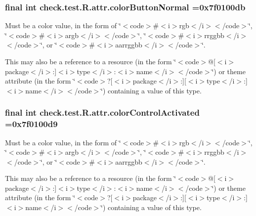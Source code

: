\subsubsection[{color\+Button\+Normal}]{\setlength{\rightskip}{0pt plus 5cm}final int check.\+test.\+R.\+attr.\+color\+Button\+Normal =0x7f0100db\hspace{0.3cm}{\ttfamily [static]}}\label{classcheck_1_1test_1_1_r_1_1attr_abef35f07161bdd7ae466dc158b37e59b}
Must be a color value, in the form of \char`\"{}$<$code$>$\#$<$i$>$rgb$<$/i$>$$<$/code$>$\char`\"{}, \char`\"{}$<$code$>$\#$<$i$>$argb$<$/i$>$$<$/code$>$\char`\"{}, \char`\"{}$<$code$>$\#$<$i$>$rrggbb$<$/i$>$$<$/code$>$\char`\"{}, or \char`\"{}$<$code$>$\#$<$i$>$aarrggbb$<$/i$>$$<$/code$>$\char`\"{}. 

This may also be a reference to a resource (in the form \char`\"{}$<$code$>$@\mbox{[}$<$i$>$package$<$/i$>$\+:\mbox{]}$<$i$>$type$<$/i$>$\+:$<$i$>$name$<$/i$>$$<$/code$>$\char`\"{}) or theme attribute (in the form \char`\"{}$<$code$>$?\mbox{[}$<$i$>$package$<$/i$>$\+:\mbox{]}\mbox{[}$<$i$>$type$<$/i$>$\+:\mbox{]}$<$i$>$name$<$/i$>$$<$/code$>$\char`\"{}) containing a value of this type. \hypertarget{classcheck_1_1test_1_1_r_1_1attr_a14f760733777b8233047aeac34c893e6}{}
\subsubsection[{color\+Control\+Activated}]{\setlength{\rightskip}{0pt plus 5cm}final int check.\+test.\+R.\+attr.\+color\+Control\+Activated =0x7f0100d9\hspace{0.3cm}{\ttfamily [static]}}\label{classcheck_1_1test_1_1_r_1_1attr_a14f760733777b8233047aeac34c893e6}
Must be a color value, in the form of \char`\"{}$<$code$>$\#$<$i$>$rgb$<$/i$>$$<$/code$>$\char`\"{}, \char`\"{}$<$code$>$\#$<$i$>$argb$<$/i$>$$<$/code$>$\char`\"{}, \char`\"{}$<$code$>$\#$<$i$>$rrggbb$<$/i$>$$<$/code$>$\char`\"{}, or \char`\"{}$<$code$>$\#$<$i$>$aarrggbb$<$/i$>$$<$/code$>$\char`\"{}. 

This may also be a reference to a resource (in the form \char`\"{}$<$code$>$@\mbox{[}$<$i$>$package$<$/i$>$\+:\mbox{]}$<$i$>$type$<$/i$>$\+:$<$i$>$name$<$/i$>$$<$/code$>$\char`\"{}) or theme attribute (in the form \char`\"{}$<$code$>$?\mbox{[}$<$i$>$package$<$/i$>$\+:\mbox{]}\mbox{[}$<$i$>$type$<$/i$>$\+:\mbox{]}$<$i$>$name$<$/i$>$$<$/code$>$\char`\"{}) containing a value of this type. \hypertarget{classcheck_1_1test_1_1_r_1_1attr_a2126d505b83f9a4e9ff11e55eb19ebe8}{}
